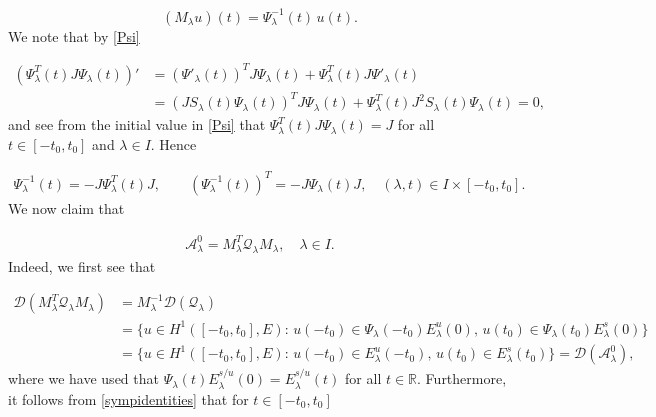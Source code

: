 \documentclass[a4paper,10pt]{article}
\begin{document}
\[(M_\lambda u)(t)=\Psi^{-1}_\lambda(t)\,u(t).\]
We note that by \eqref{Psi}

\begin{align*}
(\Psi^T_\lambda(t)J\Psi_\lambda(t))'&=(\Psi'_\lambda(t))^TJ\Psi_\lambda(t)+\Psi^T_\lambda(t)J\Psi'_\lambda(t)\\
&=(JS_\lambda(t)\Psi_\lambda(t))^TJ\Psi_\lambda(t)+\Psi^T_\lambda(t)J^2S_\lambda(t)\Psi_\lambda(t)=0,
\end{align*}
and see from the initial value in \eqref{Psi} that $\Psi^T_\lambda(t)J\Psi_\lambda(t)=J$ for all $t\in[-t_0,t_0]$ and $\lambda\in I$. Hence 

\begin{align}\label{sympidentities}
\Psi^{-1}_\lambda(t)=-J\Psi^T_\lambda(t)J,\qquad (\Psi^{-1}_\lambda(t))^T=-J\Psi_\lambda(t)J,\quad (\lambda,t)\in I\times[-t_0,t_0].
\end{align}
We now claim that

\begin{align}\label{Q=A0}
\mathcal{A}^0_\lambda=M^T_\lambda\mathcal{Q}_\lambda M_\lambda,\quad\lambda\in I.
\end{align}
Indeed, we first see that

\begin{align*}
\mathcal{D}(M^T_\lambda\mathcal{Q}_\lambda M_\lambda)&=M^{-1}_\lambda\mathcal{D}(\mathcal{Q}_\lambda)\\
&=\{u\in H^1([-t_0,t_0],E):\, u(-t_0)\in\Psi_\lambda(-t_0)E^u_\lambda(0),\, u(t_0)\in\Psi_\lambda(t_0)E^s_\lambda(0)\}\\
&=\{u\in H^1([-t_0,t_0],E):\, u(-t_0)\in E^u_\lambda(-t_0),\, u(t_0)\in E^s_\lambda(t_0)\}=\mathcal{D}(\mathcal{A}^0_\lambda),
\end{align*}
where we have used that $\Psi_\lambda(t)E^{s/u}_\lambda(0)=E^{s/u}_\lambda(t)$ for all $t\in\mathbb{R}$. Furthermore, it follows from \eqref{sympidentities} that for $t\in[-t_0,t_0]$
\end{document}
